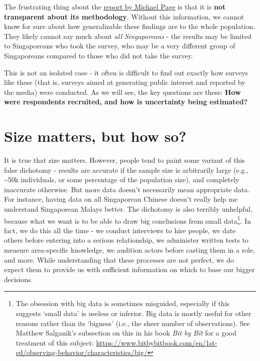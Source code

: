\documentclass[openany]{book}
\let\rmarkdownfootnote\footnote%
\def\footnote{\protect\rmarkdownfootnote}
\begin{document}
The frustrating thing about the
\href{https://www.michaelpage.com.sg/advice/career-advice/work-life-balance/singapore-happy-work}{report
by Michael Page} is that it is \textbf{not transparent about its
methodology}. Without this information, we cannot know for sure about
how generalizable these findings are to the whole population. They
likely cannot say much about \emph{all Singaporeans} - the results may
be limited to Singaporeans who took the survey, who may be a very
different group of Singaporeans compared to those who did not take the
survey.

This is not an isolated case - it often is difficult to find out exactly
how surveys like these (that is, surveys aimed at generating public
interest and reported by the media) were conducted. As we will see, the
key questions are these: \textbf{How were respondents recruited, and how
is uncertainty being estimated?}

\section{Size matters, but how so?}\label{size-matters-but-how-so}

It is true that size matters. However, people tend to paint some variant
of this false dichotomy - results are accurate if the sample size is
arbitrarily large (e.g., \textasciitilde{}50k individuals, or some
percentage of the population size), and completely inaccurate otherwise.
But more data doesn't necessarily mean appropriate data. For instance,
having data on all Singaporean Chinese doesn't really help me understand
Singaporean Malays better. The dichotomy is also terribly unhelpful,
because what we want is to be able to draw big conclusions from small
data\footnote{The obsession with big data is sometimes misguided,
  especially if this suggests `small data' is useless or inferior. Big
  data is mostly useful for other reasons rather than its `bigness'
  (i.e., the sheer number of observations). See Matthew Salganik's
  subsection on this in his book \emph{Bit by Bit} for a good treatment
  of this subject:
  \url{https://www.bitbybitbook.com/en/1st-ed/observing-behavior/characteristics/big/}}.
In fact, we do this all the time - we conduct interviews to hire people,
we date others before entering into a serious relationship, we
administer written tests to measure area-specific knowledge, we audition
actors before casting them in a role, and more. While understanding that
these processes are not perfect, we do expect them to provide us with
sufficient information on which to base our bigger decisions.
\end{document}
